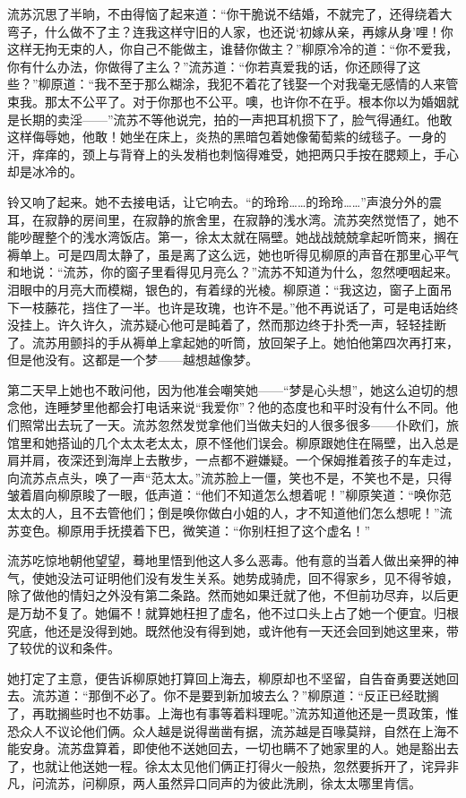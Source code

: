 \par 流苏沉思了半晌，不由得恼了起来道：“你干脆说不结婚，不就完了，还得绕着大弯子，什么做不了主？连我这样守旧的人家，也还说‘初嫁从亲，再嫁从身’哩！你这样无拘无束的人，你自己不能做主，谁替你做主？”柳原冷冷的道：“你不爱我，你有什么办法，你做得了主么？”流苏道：“你若真爱我的话，你还顾得了这些？”柳原道：“我不至于那么糊涂，我犯不着花了钱娶一个对我毫无感情的人来管束我。那太不公平了。对于你那也不公平。噢，也许你不在乎。根本你以为婚姻就是长期的卖淫——”流苏不等他说完，拍的一声把耳机掼下了，脸气得通红。他敢这样侮辱她，他敢！她坐在床上，炎热的黑暗包着她像葡萄紫的绒毯子。一身的汗，痒痒的，颈上与背脊上的头发梢也刺恼得难受，她把两只手按在腮颊上，手心却是冰冷的。
\par 铃又响了起来。她不去接电话，让它响去。“的玲玲……的玲玲……”声浪分外的震耳，在寂静的房间里，在寂静的旅舍里，在寂静的浅水湾。流苏突然觉悟了，她不能吵醒整个的浅水湾饭店。第一，徐太太就在隔壁。她战战兢兢拿起听筒来，搁在褥单上。可是四周太静了，虽是离了这么远，她也听得见柳原的声音在那里心平气和地说：“流苏，你的窗子里看得见月亮么？”流苏不知道为什么，忽然哽咽起来。泪眼中的月亮大而模糊，银色的，有着绿的光棱。柳原道：“我这边，窗子上面吊下一枝藤花，挡住了一半。也许是玫瑰，也许不是。”他不再说话了，可是电话始终没挂上。许久许久，流苏疑心他可是盹着了，然而那边终于扑秃一声，轻轻挂断了。流苏用颤抖的手从褥单上拿起她的听筒，放回架子上。她怕他第四次再打来，但是他没有。这都是一个梦——越想越像梦。
\par 第二天早上她也不敢问他，因为他准会嘲笑她——“梦是心头想”，她这么迫切的想念他，连睡梦里他都会打电话来说“我爱你”？他的态度也和平时没有什么不同。他们照常出去玩了一天。流苏忽然发觉拿他们当做夫妇的人很多很多——仆欧们，旅馆里和她搭讪的几个太太老太太，原不怪他们误会。柳原跟她住在隔壁，出入总是肩并肩，夜深还到海岸上去散步，一点都不避嫌疑。一个保姆推着孩子的车走过，向流苏点点头，唤了一声“范太太。”流苏脸上一僵，笑也不是，不笑也不是，只得皱着眉向柳原睃了一眼，低声道：“他们不知道怎么想着呢！”柳原笑道：“唤你范太太的人，且不去管他们；倒是唤你做白小姐的人，才不知道他们怎么想呢！”流苏变色。柳原用手抚摸着下巴，微笑道：“你别枉担了这个虚名！”
\par 流苏吃惊地朝他望望，蓦地里悟到他这人多么恶毒。他有意的当着人做出亲狎的神气，使她没法可证明他们没有发生关系。她势成骑虎，回不得家乡，见不得爷娘，除了做他的情妇之外没有第二条路。然而她如果迁就了他，不但前功尽弃，以后更是万劫不复了。她偏不！就算她枉担了虚名，他不过口头上占了她一个便宜。归根究底，他还是没得到她。既然他没有得到她，或许他有一天还会回到她这里来，带了较优的议和条件。
\par 她打定了主意，便告诉柳原她打算回上海去，柳原却也不坚留，自告奋勇要送她回去。流苏道：“那倒不必了。你不是要到新加坡去么？”柳原道：“反正已经耽搁了，再耽搁些时也不妨事。上海也有事等着料理呢。”流苏知道他还是一贯政策，惟恐众人不议论他们俩。众人越是说得凿凿有据，流苏越是百喙莫辩，自然在上海不能安身。流苏盘算着，即使他不送她回去，一切也瞒不了她家里的人。她是豁出去了，也就让他送她一程。徐太太见他们俩正打得火一般热，忽然要拆开了，诧异非凡，问流苏，问柳原，两人虽然异口同声的为彼此洗刷，徐太太哪里肯信。
